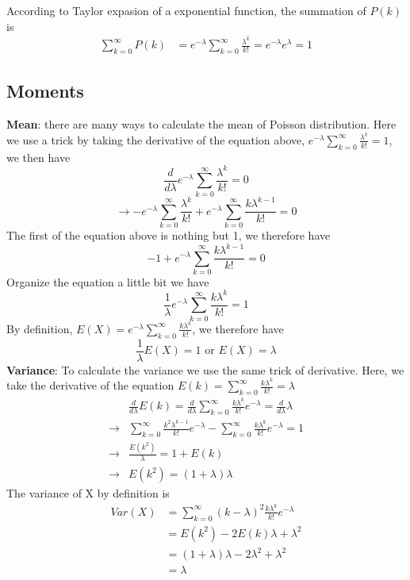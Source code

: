 \documentclass[12pt, oneside]{article}
\begin{document}
According to Taylor expasion of a exponential function, the summation of $P(k)$ is 
\begin{align*}
\sum\limits_{k=0}^{\infty} P(k)&=e^{-\lambda}\sum\limits_{k=0}^{\infty}\frac{\lambda^k}{k!}=e^{-\lambda}e^{\lambda}=1
\end{align*}

\subsection{Moments}
\textbf{Mean}: there are many ways to calculate the mean of Poisson distribution. Here we use a trick by taking the derivative of the equation above, $e^{-\lambda}\sum\limits_{k=0}^{\infty}\frac{\lambda^k}{k!}=1$, we then have 
$$\frac{d}{d\lambda}e^{-\lambda}\sum\limits_{k=0}^{\infty}\frac{\lambda^k}{k!}=0$$ 
$$\rightarrow-e^{-\lambda}\sum\limits_{k=0}^{\infty}\frac{\lambda^k}{k!}+e^{-\lambda}\sum\limits_{k=0}^{\infty}\frac{k\lambda^{k-1}}{k!}=0$$
The first of the equation above is nothing but 1, we therefore have
$$-1+e^{-\lambda}\sum\limits_{k=0}^{\infty}\frac{k\lambda^{k-1}}{k!}=0$$
Organize the equation a little bit we have
$$\frac{1}{\lambda}e^{-\lambda}\sum\limits_{k=0}^{\infty}\frac{k\lambda^{k}}{k!}=1$$
By definition,  $E(X)=e^{-\lambda}\sum\limits_{k=0}^{\infty}\frac{k\lambda^{k}}{k!}$, we therefore have
$$\frac{1}{\lambda}E(X)=1 \text{ or } E(X)=\lambda$$ 
\textbf{Variance}: To calculate the variance we use the same trick of derivative. Here, we take the derivative of the equation $E(k)=\sum\limits_{k=0}^{\infty}\frac{k\lambda^{k}}{k!}=\lambda$
\begin{align*}
&\frac{d}{d\lambda}E(k)=\frac{d}{d\lambda}\sum\limits_{k=0}^{\infty}\frac{k\lambda^{k}}{k!}e^{-\lambda}=\frac{d}{d\lambda}\lambda\\
\rightarrow&\sum\limits_{k=0}^{\infty}\frac{k^2\lambda^{k-1}}{k!}e^{-\lambda}-\sum\limits_{k=0}^{\infty}\frac{k\lambda^{k}}{k!}e^{-\lambda}=1\\
\rightarrow&\frac{E(k^2)}{\lambda}=1+E(k)\\
\rightarrow&E(k^2)=(1+\lambda)\lambda
\end{align*}
The variance of X by definition is 
\begin{align*}
Var(X)&=\sum\limits_{k=0}^{\infty}(k-\lambda)^2\frac{k\lambda^{k}}{k!}e^{-\lambda}\\
&=E(k^2)-2E(k)\lambda+\lambda^2\\
&=(1+\lambda)\lambda-2\lambda^2+\lambda^2\\
&=\lambda
\end{align*}
\end{document}
